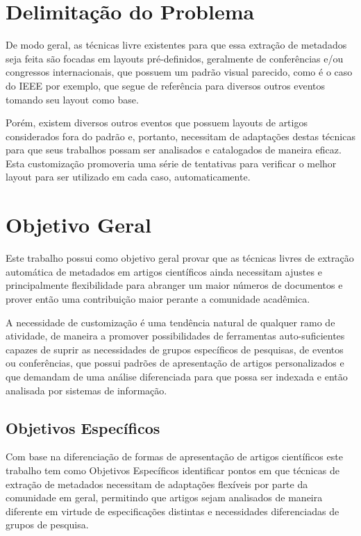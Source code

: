 \documentclass[
	12pt,               %
	openright,          %
	twoside,            %
	a4paper,            %
	english,            %
	brazil              %
	]{abntex2}
\begin{document}
\section{Delimitação do Problema}

De modo geral, as técnicas livre existentes para que essa extração de metadados seja feita são focadas em layouts pré-definidos, geralmente de conferências e/ou congressos internacionais, que possuem um padrão visual parecido, como é o caso do IEEE por exemplo, que segue de referência para diversos outros eventos tomando seu layout como base.

Porém, existem diversos outros eventos que possuem layouts de artigos considerados fora do padrão e, portanto, necessitam de adaptações destas técnicas para que seus trabalhos possam ser analisados e catalogados de maneira eficaz. Esta customização promoveria uma série de tentativas para verificar o melhor layout para ser utilizado em cada caso, automaticamente.

\section{Objetivo Geral}

Este trabalho possui como objetivo geral provar que as técnicas livres de extração automática de metadados em artigos científicos ainda necessitam ajustes e principalmente flexibilidade para abranger um maior números de documentos e prover então uma contribuição maior perante a comunidade acadêmica.

A necessidade de customização é uma tendência natural de qualquer ramo de atividade, de maneira a promover possibilidades de ferramentas auto-suficientes capazes de suprir as necessidades de grupos específicos de pesquisas, de eventos ou conferências, que possui padrões de apresentação de artigos personalizados e que demandam de uma análise diferenciada para que possa ser indexada e então analisada por sistemas de informação.

\subsection{Objetivos Específicos}

Com base na diferenciação de formas de apresentação de artigos científicos este trabalho tem como Objetivos Específicos identificar pontos em que técnicas de extração de metadados necessitam de adaptações flexíveis por parte da comunidade em geral, permitindo que artigos sejam analisados de maneira diferente em virtude de especificações distintas e necessidades diferenciadas de grupos de pesquisa.
\end{document}
